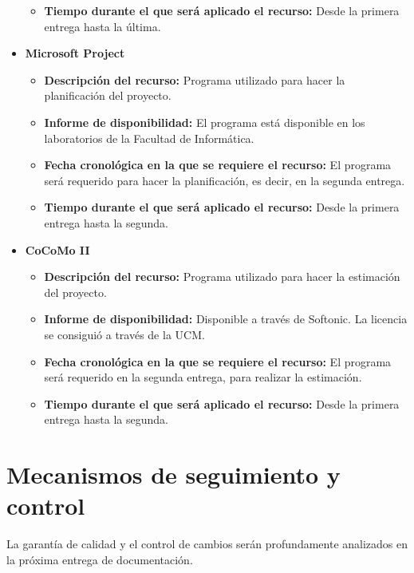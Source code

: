 \documentclass[spanish,a4paper,12pt]{report}	%
\begin{document}
\begin{itemize}
\begin{itemize}
				  	  \item \textbf{Tiempo durante el que será aplicado el recurso: }Desde la primera entrega hasta la última. 
					\end{itemize}
				\item \textbf{Microsoft Project}
				  	\begin{itemize}
				  	  \item \textbf{Descripción del recurso: } Programa utilizado para hacer la planificación del proyecto.
				  	  \item \textbf{Informe de disponibilidad: }El programa está disponible en los laboratorios de la Facultad de Informática.
				  	  \item \textbf{Fecha cronológica en la que se requiere el recurso: }El programa será requerido para hacer la planificación, es decir, en la
				  	  					segunda entrega.
				  	  \item \textbf{Tiempo durante el que será aplicado el recurso: }Desde la primera entrega hasta la segunda. 
					\end{itemize}
				\item \textbf{CoCoMo II}
				  	\begin{itemize}
				  	  \item \textbf{Descripción del recurso: } Programa utilizado para hacer la estimación del proyecto.
				  	  \item \textbf{Informe de disponibilidad: }Disponible a través de Softonic. La licencia se consiguió a través de la UCM.
				  	  \item \textbf{Fecha cronológica en la que se requiere el recurso: }El programa será requerido en la segunda entrega, para
				  	  						realizar la estimación.
				  	  \item \textbf{Tiempo durante el que será aplicado el recurso: }Desde la primera entrega hasta la segunda. 
					\end{itemize}
			\end{itemize} 

\newpage
\mbox{}
\thispagestyle{empty}						%
\newpage
\setcounter{section}{0}



\chapter{Mecanismos de seguimiento y control} La garantía de calidad y el control de cambios serán profundamente analizados en la próxima entrega de documentación.
\end{document}
